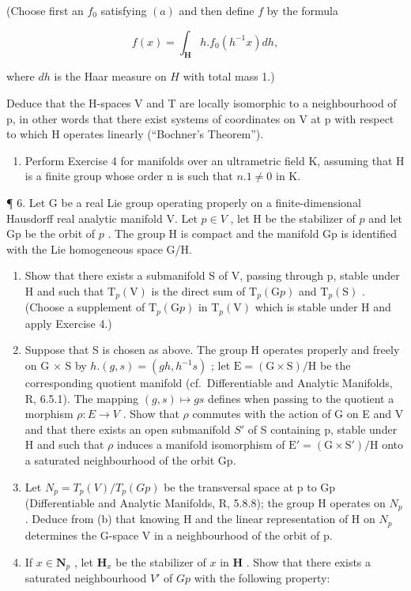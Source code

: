 (Choose first an \(f_0\) satisfying \((a)\) and then define \(f\) by the formula

\[
f (x) = \int_ {\mathbf {H}} h. f _ {0} (h ^ {- 1} x) d h,
\]

where \(dh\) is the Haar measure on \(H\) with total mass 1.)

Deduce that the H-spaces V and T are locally isomorphic to a neighbourhood of p, in other words that there exist systems of coordinates on V at p with respect to which H operates linearly (``Bochner's Theorem'').

\begin{enumerate}
\def\labelenumi{\arabic{enumi}.}
\setcounter{enumi}{4}
\tightlist
\item
  Perform Exercise 4 for manifolds over an ultrametric field K, assuming that H is a finite group whose order n is such that \(n.1 \neq 0\) in K.
\end{enumerate}

¶ 6. Let G be a real Lie group operating properly on a finite-dimensional Hausdorff real analytic manifold V. Let \(p \in V\) , let H be the stabilizer of \(p\) and let Gp be the orbit of \(p\) . The group H is compact and the manifold Gp is identified with the Lie homogeneous space G/H.

\begin{enumerate}
\def\labelenumi{(\alph{enumi})}
\item
  Show that there exists a submanifold S of V, passing through p, stable under H and such that \(\mathrm{T}_{p}(\mathrm{V})\) is the direct sum of \(\mathrm{T}_{p}(\mathrm{G}p)\) and \(\mathrm{T}_{p}(\mathrm{S})\) . (Choose a supplement of \(\mathrm{T}_{p}(\mathrm{G}p)\) in \(\mathrm{T}_{p}(\mathrm{V})\) which is stable under H and apply Exercise 4.)
\item
  Suppose that S is chosen as above. The group H operates properly and freely on G × S by \(h.(g,s)=(gh,h^{-1}s)\) ; let \(\mathrm{E}=(\mathrm{G}\times\mathrm{S})/\mathrm{H}\) be the corresponding quotient manifold (cf.~Differentiable and Analytic Manifolds, R, 6.5.1). The mapping \((g,s)\mapsto gs\) defines when passing to the quotient a morphism \(\rho:E\to V\) . Show that \(\rho\) commutes with the action of G on E and V and that there exists an open submanifold \(S'\) of S containing p, stable under H and such that \(\rho\) induces a manifold isomorphism of \(\mathrm{E}'=(\mathrm{G}\times\mathrm{S}')/\mathrm{H}\) onto a saturated neighbourhood of the orbit Gp.
\item
  Let \(N_{p} = T_{p}(V)/T_{p}(Gp)\) be the transversal space at p to Gp (Differentiable and Analytic Manifolds, R, 5.8.8); the group H operates on \(N_{p}\) . Deduce from (b) that knowing H and the linear representation of H on \(N_{p}\) determines the G-space V in a neighbourhood of the orbit of p.
\item
  If \(x \in \mathbf{N}_p\) , let \(\mathbf{H}_x\) be the stabilizer of \(x\) in \(\mathbf{H}\) . Show that there exists a saturated neighbourhood \(V'\) of \(Gp\) with the following property:
\end{enumerate}


